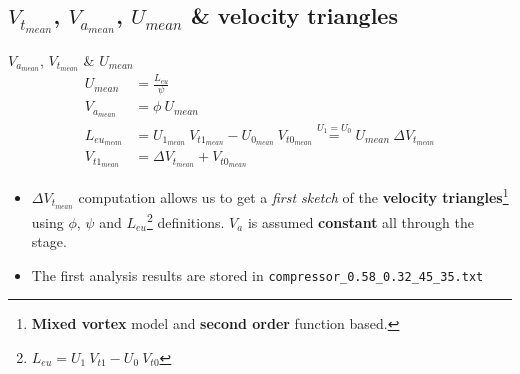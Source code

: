 	\subsection{$V_{t_{mean}}$, $V_{a_{mean}}$, $U_{mean}$ \& velocity triangles}
\begin{frame}[fragile]{$V_{a_{mean}}$, $V_{t_{mean}}$ \& $U_{mean}$}
	\vspace{-0.8cm}
	\begin{align}
		U_{mean} & = \frac{L_{eu}}{\psi} \nonumber \\ 
		V_{a_{mean}} & = \phi \ U_{mean} \nonumber \\
		L_{eu_{mean}} & = U_{1_{mean}} \ V_{t1_{mean}} - U_{0_{mean}} \ V_{t0_{mean}} \overset{U_1 = U_0}{=} U_{mean} \ \Delta V_{t_{mean}} \nonumber \\
		V_{t1_{mean}} & = \Delta V_{t_{mean}} + V_{t0_{mean}} \nonumber  
	\end{align}
	\vspace{-0.3cm}
	\begin{itemize}
		\item $\Delta V_{t_{mean}}$ computation allows us to get a \textit{first sketch} of the \textbf{velocity triangles}\footnote{\textbf{Mixed vortex} model and \textbf{second order} function based.} using $\phi$, $\psi$ and $L_{eu}$\footnote{$L_{eu} = U_1 \ V_{t1} - U_0 \ V_{t0}$} definitions. $V_a$ is assumed \textbf{constant} all through the stage.
		\item The first analysis results are stored in \verb|compressor_0.58_0.32_45_35.txt|
	\end{itemize}
\end{frame}

